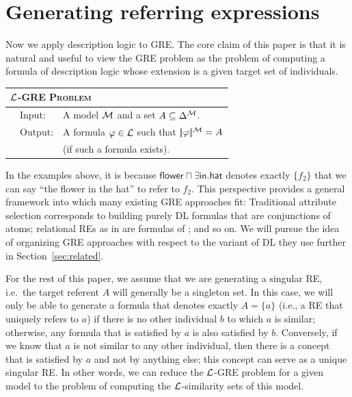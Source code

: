 \section{Generating referring expressions} \label{sec:gre}

Now we apply description logic to GRE.  The core claim of this paper
is that it is natural and useful to view the GRE problem as the
problem of computing a formula of description logic whose extension is
a given target set of individuals.

\medskip
\noindent
{\small
\begin{center}
\begin{tabular}{ll} \hline
\multicolumn{2}{l}{
\textsc{$\mathcal{L}$-GRE Problem}}\\ \hline
\ \ Input: & A model $\mathcal{M}$ and a set $A \subseteq \Delta^{\mathcal{M}}$.\\
\ \ Output: & A formula $\varphi \in \mathcal{L}$ such that
$|\!|\varphi|\!|^{\mathcal{M}} = A$\\ 
& \hspace*{0.5cm} (if such a formula exists).\\ \hline
\end{tabular}
\end{center}}
\medskip

In the examples above, it is because $\mathsf{flower} \sqcap \exists
\mathsf{in}. \mathsf{hat}$ denotes exactly $\{f_2\}$ that we can say
``the flower in the hat'' to refer to $f_2$.  This perspective
provides a general framework into which many existing GRE approaches
fit: Traditional attribute selection \cite{Dale1995} corresponds to
building purely DL formulas that are conjunctions of atoms; relational
REs as in  are
formulas of \el; and so on.  We will pursue the idea of organizing GRE
approaches with respect to the variant of DL they use further in
Section~\ref{sec:related}.

For the rest of this paper, we assume that we are generating a
singular RE, i.e.\ the target referent $A$ will generally be a
singleton set.  In this case, we will only be able to generate a
formula that denotes exactly $A = \{a\}$ (i.e., a RE that uniquely
refers to $a$) if there is no other individual $b$ to which $a$ is
similar; otherwise, any formula that is satisfied by $a$ is also
satisfied by $b$.  Conversely, if we know that $a$ is not similar to
any other individual, then there is a concept that is satisfied by $a$
and not by anything else; this concept can serve as a unique singular
RE.  In other words, we can reduce the $\mathcal{L}$-GRE problem for a given
model to the problem of computing the $\mathcal{L}$-similarity sets of this
model.

